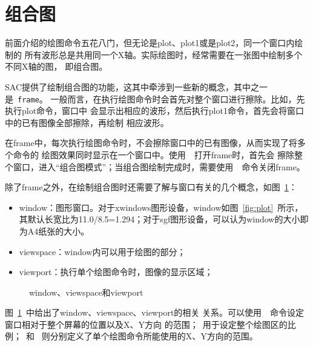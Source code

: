 \section{组合图}
\label{sec:composite-plots}

前面介绍的绘图命令五花八门，但无论是plot、plot1或是plot2，同一个窗口内绘制的
所有波形总是共用同一个X轴。实际绘图时，经常需要在一张图中绘制多个不同X轴的图，
即组合图。

SAC提供了绘制组合图的功能，这其中牵涉到一些新的概念，其中之一是~\verb+frame+。
一般而言，在执行绘图命令时会首先对整个窗口进行擦除。比如，先执行plot命令，窗口中
会显示出相应的波形，然后执行plot1命令，首先会将窗口中的已有图像全部擦除，再绘制
相应波形。

在frame中，每次执行绘图命令时，不会擦除窗口中的已有图像，从而实现了将多个命令的
绘图效果同时显示在一个窗口中。使用~~打开frame时，首先会
擦除整个窗口，进入``组合图模式''；当组合图绘制完成时，需要使用~~命令关闭frame。

除了frame之外，在绘制组合图时还需要了解与窗口有关的几个概念，如图~\ref{fig:window-viewspace-viewport}：
\begin{itemize}
\item window：图形窗口。对于xwindows图形设备，window如图~\ref{fig:plot}~所示，
    其默认长宽比为11.0/8.5=1.294；对于sgf图形设备，可以认为window的大小即为A4纸张的大小。
\item viewspace：window内可以用于绘图的部分；
\item viewport：执行单个绘图命令时，图像的显示区域；
\end{itemize}

\begin{figure}[H]
\centering
{}
\caption{window、viewspace和viewport}
\label{fig:window-viewspace-viewport}
\end{figure}

图~\ref{fig:window-viewspace-viewport}~中给出了window、viewspace、viewport的相关
关系。可以使用~~命令设定窗口相对于整个屏幕的位置以及X、Y方向
的范围；~用于设定整个绘图区的比例；~和
~则分别定义了单个绘图命令所能使用的X、Y方向的范围。

